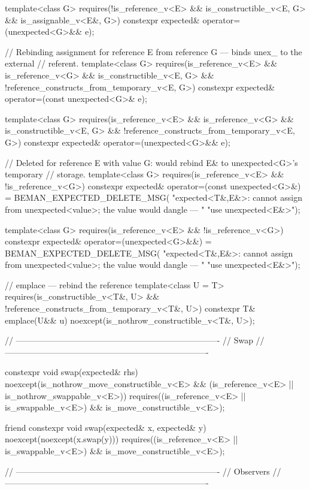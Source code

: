 \begin{codeblock}
{  template<class G>
    requires(!is_reference_v<E> && is_constructible_v<E, G> && is_assignable_v<E&, G>)
  constexpr expected& operator=(unexpected<G>&& e);

  // Rebinding assignment for reference E from reference G — binds unex_ to the external
  // referent.
  template<class G>
    requires(is_reference_v<E> && is_reference_v<G> && is_constructible_v<E, G> &&
             !reference_constructs_from_temporary_v<E, G>)
  constexpr expected& operator=(const unexpected<G>& e);

  template<class G>
    requires(is_reference_v<E> && is_reference_v<G> && is_constructible_v<E, G> &&
             !reference_constructs_from_temporary_v<E, G>)
  constexpr expected& operator=(unexpected<G>&& e);

  // Deleted for reference E with value G: would rebind E& to unexpected<G>'s temporary
  // storage.
  template<class G>
    requires(is_reference_v<E> && !is_reference_v<G>)
  constexpr expected& operator=(const unexpected<G>&) = BEMAN_EXPECTED_DELETE_MSG(
      "expected<T&,E&>: cannot assign from unexpected<value>; the value would dangle — "
      "use unexpected<E&>");

  template<class G>
    requires(is_reference_v<E> && !is_reference_v<G>)
  constexpr expected& operator=(unexpected<G>&&) = BEMAN_EXPECTED_DELETE_MSG(
      "expected<T&,E&>: cannot assign from unexpected<value>; the value would dangle — "
      "use unexpected<E&>");

  // emplace — rebind the reference
  template<class U = T>
    requires(is_constructible_v<T&, U> && !reference_constructs_from_temporary_v<T&, U>)
  constexpr T& emplace(U&& u) noexcept(is_nothrow_constructible_v<T&, U>);

  // -------------------------------------------------------------------------
  // Swap
  // -------------------------------------------------------------------------

  constexpr void swap(expected& rhs) noexcept(is_nothrow_move_constructible_v<E> &&
                                              (is_reference_v<E> ||
                                               is_nothrow_swappable_v<E>))
    requires((is_reference_v<E> || is_swappable_v<E>) && is_move_constructible_v<E>);

  friend constexpr void swap(expected& x, expected& y) noexcept(noexcept(x.swap(y)))
    requires((is_reference_v<E> || is_swappable_v<E>) && is_move_constructible_v<E>);

  // -------------------------------------------------------------------------
  // Observers
  // -------------------------------------------------------------------------

}
\end{codeblock}
